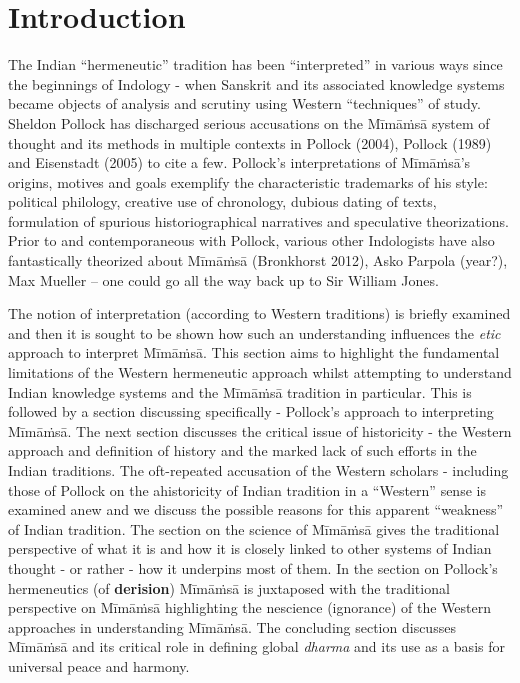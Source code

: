 \section*{Introduction}

The Indian “hermeneutic” tradition has been “interpreted” in various ways since the beginnings of Indology - when Sanskrit and its associated knowledge systems became objects of analysis and scrutiny using Western “techniques” of study. Sheldon Pollock has discharged serious accusations on the Mīmāṁsā system of thought and its methods in multiple contexts in Pollock (2004), Pollock (1989) and Eisenstadt (2005) to cite a few. Pollock’s interpretations of Mīmāṁsā’s origins, motives and goals exemplify the characteristic trademarks of his style: political philology, creative use of chronology, dubious dating of texts, formulation of spurious historiographical narratives and speculative theorizations. Prior to and contemporaneous with Pollock, various other Indologists have also fantastically theorized about Mīmāṁsā (Bronkhorst 2012), Asko Parpola (year?), Max Mueller – one could go all the way back up to Sir William Jones.

The notion of interpretation (according to Western traditions) is briefly examined and then it is sought to be shown how such an understanding influences the \textit{etic} approach to interpret Mīmāṁsā. This section aims to highlight the fundamental limitations of the Western hermeneutic approach whilst attempting to understand Indian knowledge systems and the Mīmāṁsā tradition in particular. This is followed by a section discussing specifically - Pollock’s approach to interpreting Mīmāṁsā. The next section discusses the critical issue of historicity - the Western approach and definition of history and the marked lack of such efforts in the Indian traditions. The oft-repeated accusation of the Western scholars - including those of Pollock on the ahistoricity of Indian tradition in a “Western” sense is examined anew and we discuss the possible reasons for this apparent “weakness” of Indian tradition. The section on the science of Mīmāṁsā gives the traditional perspective of what it is and how it is closely linked to other systems of Indian thought - or rather - how it underpins most of them. In the section on Pollock’s hermeneutics (of \textbf{derision}) Mīmāṁsā is juxtaposed with the traditional perspective on Mīmāṁsā highlighting the nescience (ignorance) of the Western approaches in understanding Mīmāṁsā. The concluding section discusses Mīmāṁsā and its critical role in defining global \textit{dharma} and its use as a basis for universal peace and harmony.


